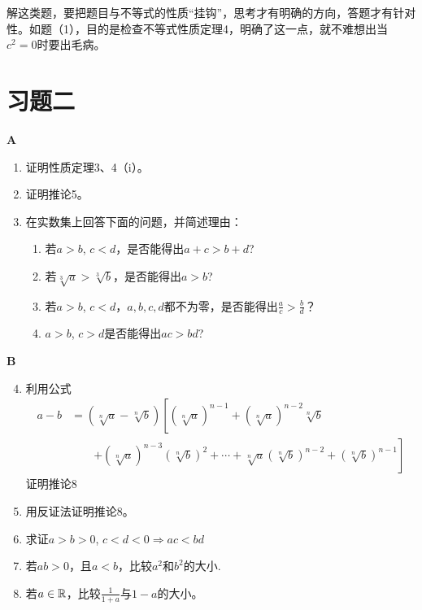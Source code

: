 \begin{rmk}
    解这类题，要把题目与不等式的性质“挂钩”，思考才有明确的方向，答题才有针对性。如题（1），目的是检查不等式性质定理4，明确了这一点，就不难想出当$c^2=0$时要出毛病。
\end{rmk}

\section*{习题二}
\begin{center}
    \bfseries A
\end{center}
\begin{enumerate}
    \item 证明性质定理3、4（i）。
\item 证明推论5。
\item 在实数集上回答下面的问题，并简述理由：
\begin{enumerate}[(1)]
    \item 若$a>b$, $c<d$，是否能得出$a+c>b+d$?
    \item 若$\sqrt[3]{a}>\sqrt[3]{b}$，是否能得出$a>b$?
    \item 若$a>b$, $c<d$，$a,b,c,d$都不为零，是否能得出$\frac{a}{c}>\frac{b}{d}$？
    \item $a>b$, $c>d$是否能得出$ac>bd$?
\end{enumerate}
\end{enumerate}

\begin{center}
    \bfseries B
\end{center}
\begin{enumerate}\setcounter{enumi}{3}
    \item 利用公式
\[\begin{split}
   a-b&=\left(\sqrt[n]{a}-\sqrt[n]{b}\right)\left[\left(\sqrt[n]{a}\right)^{n-1}+\left(\sqrt[n]{a}\right)^{n-2}\sqrt[n]{b}\right.\\
   &\qquad \left.+\left(\sqrt[n]{a}\right)^{n-3}\left(\sqrt[n]{b}\right)^2 +\cdots +\sqrt[n]{a}\left(\sqrt[n]{b}\right)^{n-2}+\left(\sqrt[n]{b}\right)^{n-1}\right] 
\end{split}
    \]
证明推论8
\item 用反证法证明推论8。
\item 求证$a>b>0$, $c<d<0\Longrightarrow ac<bd$
\item 若$ab>0$，且$a<b$，比较$a^2$和$b^2$的大小.
\item 若$a\in\mathbb{R}$，比较$\frac{1}{1+a}$与$1-a$的大小。
\end{enumerate}

